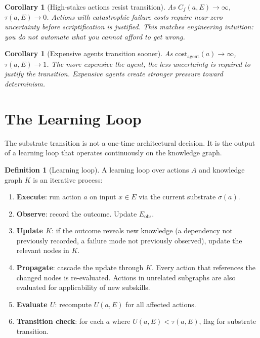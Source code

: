 \documentclass[11pt]{article}
\newtheorem{corollary}[theorem]{Corollary}
\theoremstyle{definition}
\newtheorem{definition}{Definition}
\begin{document}
\begin{corollary}[High-stakes actions resist transition]
\label{cor:high-stakes}
As $C_f(a,E) \to \infty$, $\tau(a,E) \to 0$. Actions with
catastrophic failure costs require near-zero uncertainty before
scriptification is justified. This matches engineering intuition:
you do not automate what you cannot afford to get wrong.
\end{corollary}

\begin{corollary}[Expensive agents transition sooner]
\label{cor:expensive-agents}
As $\text{cost}_{\text{agent}}(a) \to \infty$, $\tau(a,E) \to 1$.
The more expensive the agent, the less uncertainty is required to
justify the transition. Expensive agents create stronger pressure
toward determinism.
\end{corollary}

\section{The Learning Loop}
\label{sec:learning-loop}

The substrate transition is not a one-time architectural decision. It
is the output of a learning loop that operates continuously on the
knowledge graph.

\begin{definition}[Learning loop]
\label{def:learning-loop}
A learning loop over actions $A$ and knowledge graph $K$ is an
iterative process:
\begin{enumerate}
\item \textbf{Execute}: run action $a$ on input $x \in E$ via the
   current substrate $\sigma(a)$.
\item \textbf{Observe}: record the outcome. Update $E_{\text{obs}}$.
\item \textbf{Update $K$}: if the outcome reveals new knowledge
   (a dependency not previously recorded, a failure mode not previously
   observed), update the relevant nodes in $K$.
\item \textbf{Propagate}: cascade the update through $K$. Every action
   that references the changed nodes is re-evaluated. Actions in
   unrelated subgraphs are also evaluated for applicability of new
   subskills.
\item \textbf{Evaluate $U$}: recompute $U(a, E)$ for all affected
   actions.
\item \textbf{Transition check}: for each $a$ where
   $U(a, E) < \tau(a, E)$, flag for substrate transition.
\end{enumerate}
\end{definition}
\end{document}
